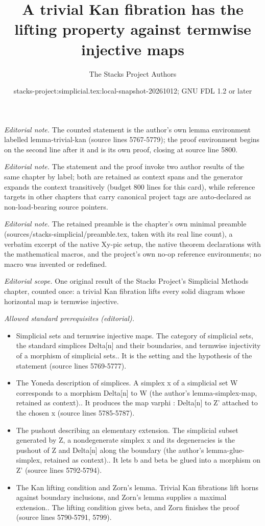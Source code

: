 \documentclass{stacks-project}
\title{A trivial Kan fibration has the lifting property against termwise injective maps}
\author{The Stacks Project Authors}
\date{stacks-project:simplicial.tex:local-snapshot-20261012; GNU FDL 1.2 or later}
\theoremstyle{plain}
\theoremstyle{definition}
\theoremstyle{remark}
\numberwithin{equation}{subsection}
\begin{document}
\maketitle
\noindent\textit{Editorial note.} The counted statement is the author's own lemma environment labelled lemma-trivial-kan (source lines 5767-5779); the proof environment begins on the second line after it and is its own proof, closing at source line 5800.\par\medskip
\noindent\textit{Editorial note.} The statement and the proof invoke two author results of the same chapter by label; both are retained as context spans and the generator expands the context transitively (budget 800 lines for this card), while reference targets in other chapters that carry canonical project tags are auto-declared as non-load-bearing source pointers.\par\medskip
\noindent\textit{Editorial note.} The retained preamble is the chapter's own minimal preamble (sources/stacks-simplicial/preamble.tex, taken with its real line count), a verbatim excerpt of the native Xy-pic setup, the native theorem declarations with the mathematical macros, and the project's own no-op reference environments; no macro was invented or redefined.\par\medskip
\noindent\textit{Editorial scope.} One original result of the Stacks Project's Simplicial Methods chapter, counted once: a trivial Kan fibration lifts every solid diagram whose horizontal map is termwise injective.\par\medskip
\noindent\textit{Allowed standard prerequisites (editorial).}\begin{itemize}
\item Simplicial sets and termwise injective maps. The category of simplicial sets, the standard simplices Delta[n] and their boundaries, and termwise injectivity of a morphism of simplicial sets.. It is the setting and the hypothesis of the statement (source lines 5769-5777).
\item The Yoneda description of simplices. A simplex x of a simplicial set W corresponds to a morphism Delta[n] to W (the author's lemma-simplex-map, retained as context).. It produces the map varphi : Delta[n] to Z' attached to the chosen x (source lines 5785-5787).
\item The pushout describing an elementary extension. The simplicial subset generated by Z, a nondegenerate simplex x and its degeneracies is the pushout of Z and Delta[n] along the boundary (the author's lemma-glue-simplex, retained as context).. It lets b and beta be glued into a morphism on Z' (source lines 5792-5794).
\item The Kan lifting condition and Zorn's lemma. Trivial Kan fibrations lift horns against boundary inclusions, and Zorn's lemma supplies a maximal extension.. The lifting condition gives beta, and Zorn finishes the proof (source lines 5790-5791, 5799).
\end{itemize}\medskip
\end{document}
